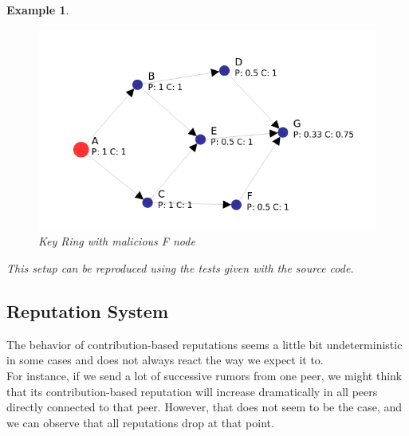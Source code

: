 \documentclass[]{article}
\newtheorem{exmp}{Example}[section]
\begin{document}
\begin{exmp}
	\begin{figure}[h]
		\includegraphics[width=\textwidth,height=\textheight,keepaspectratio]{keyring-bad1}
		\centering
		\caption{Key Ring with malicious F node}
		\label{fig:keyring_bad1}
	\end{figure}

	This setup can be reproduced using the tests given with the source code.

\end{exmp}

\subsection{Reputation System}
  The behavior of contribution-based reputations seems a little bit undeterministic in some cases and does not always react the way we expect it to.
  \\
  For instance, if we send a lot of successive rumors from one peer, we might think that its contribution-based reputation will increase dramatically in all peers directly connected to that peer.
  However, that does not seem to be the case, and we can observe that all reputations drop at that point.


{}

\end{document}
